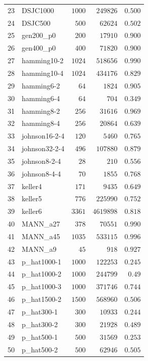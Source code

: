 \documentclass[draft,final]{vutinfth} %
\begin{document}
\begin{table}
{\begin{tabular}{|r|l|r|r|r|}
        23 & DSJC1000 & $1000$ & $249826$ & $0.500$\\
        24 & DSJC500 & $500$ & $62624$ & $0.502$\\
        25 & gen200\_p0 & $200$ & $17910$ & $0.900$\\
        26 & gen400\_p0 & $400$ & $71820$ & $0.900$\\
        27 & hamming10-2 & $1024$ & $518656$ & $0.990$\\
        28 & hamming10-4 & $1024$ & $434176$ & $0.829$\\
        29 & hamming6-2 & $64$ & $1824$ & $0.905$\\
        30 & hamming6-4 & $64$ & $704$ & $0.349$\\
        31 & hamming8-2 & $256$ & $31616$ & $0.969$\\
        32 & hamming8-4 & $256$ & $20864$ & $0.639$\\
        33 & johnson16-2-4 & $120$ & $5460$ & $0.765$\\
        34 & johnson32-2-4 & $496$ & $107880$ & $0.879$\\
        35 & johnson8-2-4 & $28$ & $210$ & $0.556$\\
        36 & johnson8-4-4 & $70$ & $1855$ & $0.768$\\
        37 & keller4 & $171$ & $9435$ & $0.649$\\
        38 & keller5 & $776$ & $225990$ & $0.752$\\
        39 & keller6 & $3361$ & $4619898$ & $0.818$\\
        40 & MANN\_a27 & $378$ & $70551$ & $0.990$\\
        41 & MANN\_a45 & $1035$ & $533115$ & $0.996$\\
        42 & MANN\_a9 & $45$ & $918$ & $0.927$\\
        43 & p\_hat1000-1 & $1000$ & $122253$ & $0.245$\\
        44 & p\_hat1000-2 & $1000$ & $244799$ & $0.49$\\
        45 & p\_hat1000-3 & $1000$ & $371746$ & $0.744$\\
        46 & p\_hat1500-2 & $1500$ & $568960$ & $0.506$\\
        47 & p\_hat300-1 & $300$ & $10933$ & $0.244$\\
        48 & p\_hat300-2 & $300$ & $21928$ & $0.489$\\
        49 & p\_hat500-1 & $500$ & $31569$ & $0.253$\\
        50 & p\_hat500-2 & $500$ & $62946$ & $0.505$\\

\end{tabular}}
\end{table}
\end{document}
